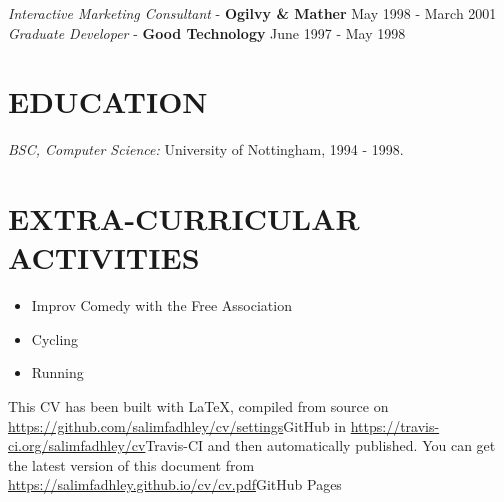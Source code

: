 \documentclass[margin, 10pt]{res} %
\begin{document}
\begin{resume}
        {\sl Interactive Marketing Consultant} - \textbf{Ogilvy \& Mather} \hfill May 1998 - March 2001\\

        {\sl Graduate Developer} - \textbf{Good Technology} \hfill June 1997 - May 1998\\

        \section{EDUCATION}

        {\sl BSC, Computer Science:} University of Nottingham, 1994 - 1998. \\


        \section{EXTRA-CURRICULAR \\ ACTIVITIES}


        \begin{itemize}
            \item Improv Comedy with the Free Association
            \item Cycling
            \item Running
        \end{itemize}


        {\tiny This CV has been built with \LaTeX, compiled from source on \url{https://github.com/salimfadhley/cv/settings}{GitHub} in \url{https://travis-ci.org/salimfadhley/cv}{Travis-CI} and then
        automatically published. You can get the latest version of this document from \url{https://salimfadhley.github.io/cv/cv.pdf}{GitHub Pages}}

    \end{resume}
\end{document}

